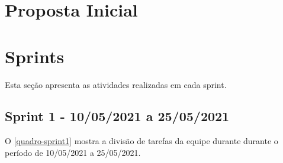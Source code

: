 
\begin{apendicesenv}

\partapendices
\chapter{Proposta Inicial}


\chapter{Sprints}
\label{sprints-atividades}

Esta seção apresenta as atividades realizadas em cada \gls{sprint}.


\section{Sprint 1 - 10/05/2021 a 25/05/2021}

O \autoref{quadro-sprint1} mostra a divisão de tarefas da equipe durante durante o período de 10/05/2021 a 25/05/2021.


\end{apendicesenv}
